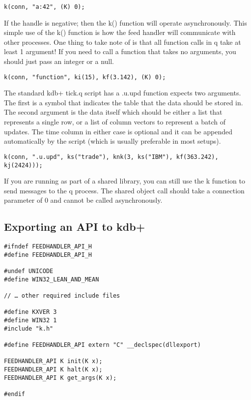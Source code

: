 \begin{lstlisting}
k(conn, "a:42", (K) 0);
\end{lstlisting}

If the handle is negative; then the k() function will operate asynchronously. This simple use of the k() 
function is how the feed handler will communicate with other processes. One thing to take note of is that
all function calls in q take at least 1 argument! If you need to call a function that takes no arguments,
you should just pass an integer or a null.

\begin{lstlisting}
k(conn, "function", ki(15), kf(3.142), (K) 0);
\end{lstlisting}

The standard kdb+ tick.q script has a .u.upd function expects two arguments. The first is a symbol that
indicates the table that the data should be stored in. The second argument is the data itself which should
be either a list that represents a single row, or a list of column vectors to represent a batch of updates.
The time column in either case is optional and it can be appended automatically by the script (which is
usually preferable in most setups).

\begin{lstlisting}
k(conn, ".u.upd", ks("trade"), knk(3, ks("IBM"), kf(363.242), kj(2424)));
\end{lstlisting}

If you are running as part of a shared library, you can still use the k function to send messages to the q
process. The shared object call should take a connection parameter of 0 and cannot be called asynchronously.

\subsection{Exporting an API to kdb+}

\begin{lstlisting}
#ifndef FEEDHANDLER_API_H
#define FEEDHANDLER_API_H

#undef UNICODE
#define WIN32_LEAN_AND_MEAN

// … other required include files

#define KXVER 3
#define WIN32 1
#include "k.h"

#define FEEDHANDLER_API extern "C" __declspec(dllexport)

FEEDHANDLER_API K init(K x);
FEEDHANDLER_API K halt(K x);
FEEDHANDLER_API K get_args(K x);

#endif
\end{lstlisting}

